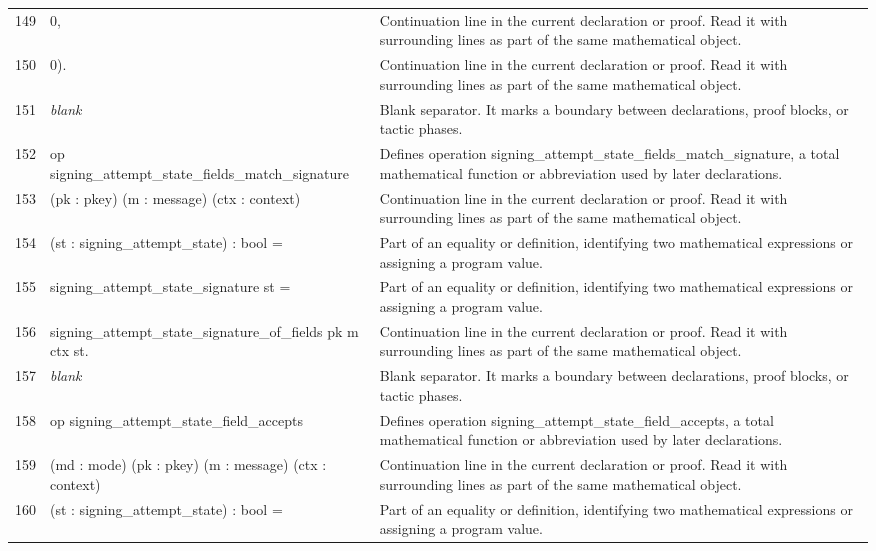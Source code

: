 \documentclass[10pt]{article}
\begin{document}
\begin{longtable}{r L{0.53\textwidth} L{0.37\textwidth}}
149 & {\ttfamily\scriptsize     0,} & Continuation line in the current declaration or proof.  Read it with surrounding lines as part of the same mathematical object. \\
150 & {\ttfamily\scriptsize     0).} & Continuation line in the current declaration or proof.  Read it with surrounding lines as part of the same mathematical object. \\
151 & {\ttfamily\scriptsize \emph{blank}} & Blank separator.  It marks a boundary between declarations, proof blocks, or tactic phases. \\
152 & {\ttfamily\scriptsize op signing\_attempt\_state\_fields\_match\_signature} & Defines operation signing\_attempt\_state\_fields\_match\_signature, a total mathematical function or abbreviation used by later declarations. \\
153 & {\ttfamily\scriptsize    (pk : pkey) (m : message) (ctx : context)} & Continuation line in the current declaration or proof.  Read it with surrounding lines as part of the same mathematical object. \\
154 & {\ttfamily\scriptsize    (st : signing\_attempt\_state) : bool =} & Part of an equality or definition, identifying two mathematical expressions or assigning a program value. \\
155 & {\ttfamily\scriptsize   signing\_attempt\_state\_signature st =} & Part of an equality or definition, identifying two mathematical expressions or assigning a program value. \\
156 & {\ttfamily\scriptsize     signing\_attempt\_state\_signature\_of\_fields pk m ctx st.} & Continuation line in the current declaration or proof.  Read it with surrounding lines as part of the same mathematical object. \\
157 & {\ttfamily\scriptsize \emph{blank}} & Blank separator.  It marks a boundary between declarations, proof blocks, or tactic phases. \\
158 & {\ttfamily\scriptsize op signing\_attempt\_state\_field\_accepts} & Defines operation signing\_attempt\_state\_field\_accepts, a total mathematical function or abbreviation used by later declarations. \\
159 & {\ttfamily\scriptsize    (md : mode) (pk : pkey) (m : message) (ctx : context)} & Continuation line in the current declaration or proof.  Read it with surrounding lines as part of the same mathematical object. \\
160 & {\ttfamily\scriptsize    (st : signing\_attempt\_state) : bool =} & Part of an equality or definition, identifying two mathematical expressions or assigning a program value. \\

\end{longtable}
\end{document}

